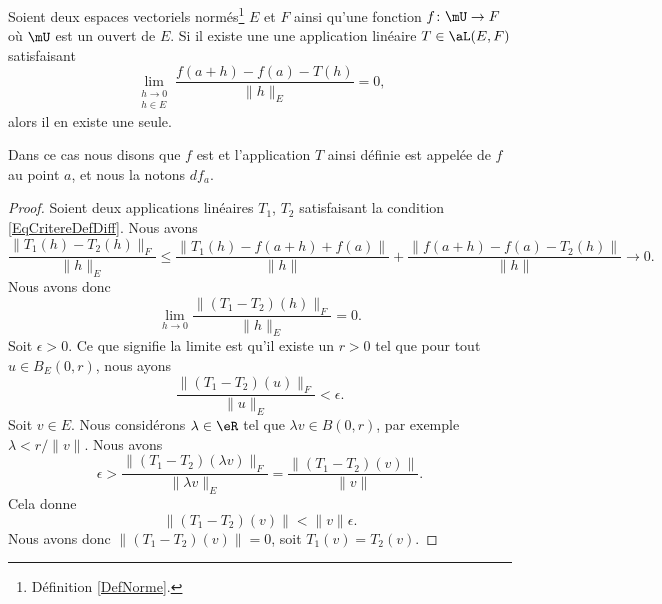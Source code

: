 \begin{propositionDef}      \label{DefDifferentiellePta}
	Soient deux espaces vectoriels normés\footnote{Définition \ref{DefNorme}.} \( E\) et \( F\) ainsi qu'une fonction \( f\colon \mU\to F\) où \( \mU\) est un ouvert de \( E\). Si il existe une une application linéaire \( T\in\aL(E,F)\) satisfaisant
	\begin{equation}	\label{EqCritereDefDiff}
		\lim_{\substack{h\to 0\\h\in E}}\frac{f(a+h)-f(a)-T(h)}{\|h\|_E}=0,
	\end{equation}
	alors il en existe une seule.

	Dans ce cas nous disons que \( f\) est  et l'application \( T\) ainsi définie est appelée  de \( f\) au point \( a\), et nous la notons \( df_a\).
\end{propositionDef}

\begin{proof}
	Soient deux applications linéaires \( T_1\), \( T_2\) satisfaisant la condition \eqref{EqCritereDefDiff}. Nous avons
	\begin{equation}
		\frac{ \| T_1(h)-T_2(h) \|_F }{ \| h \|_E }\leq \frac{ \| T_1(h)-f(a+h)+f(a) \| }{ \| h \| }+\frac{ \| f(a+h)-f(a)-T_2(h) \| }{ \| h \| }\to 0.
	\end{equation}
	Nous avons donc
	\begin{equation}
		\lim_{h\to 0} \frac{ \| (T_1-T_2)(h) \|_F }{ \| h \|_E }=0.
	\end{equation}
	Soit \( \epsilon>0\). Ce que signifie la limite est qu'il existe un \( r>0\) tel que pour tout \( u\in B_E(0,r)\), nous ayons
	\begin{equation}
		\frac{ \| (T_1-T_2)(u) \|_F }{ \| u \|_E }<\epsilon.
	\end{equation}
	Soit \( v\in E\). Nous considérons \( \lambda\in\eR\) tel que \( \lambda v\in B(0,r)\), par exemple \( \lambda<r/\| v \|\). Nous avons
	\begin{equation}
		\epsilon>\frac{ \| (T_1-T_2)(\lambda v) \|_F }{ \| \lambda v \|_E }=\frac{ \| (T_1-T_2)(v) \| }{ \| v \| }.
	\end{equation}
	Cela donne
	\begin{equation}
		\| (T_1-T_2)(v) \|<\| v \|\epsilon.
	\end{equation}
	Nous avons donc \( \| (T_1-T_2)(v) \|=0\), soit \( T_1(v)=T_2(v)\).
\end{proof}

